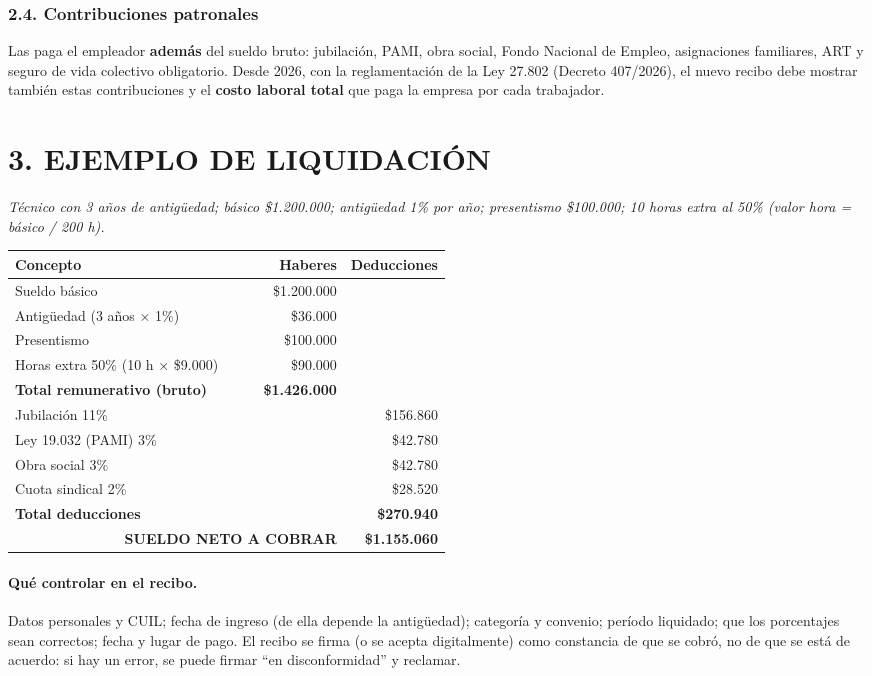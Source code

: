 \subsubsection*{2.4. Contribuciones patronales}
Las paga el empleador \textbf{además} del sueldo bruto: jubilación, PAMI, obra social, Fondo
Nacional de Empleo, asignaciones familiares, ART y seguro de vida colectivo obligatorio. Desde
2026, con la reglamentación de la Ley 27.802 (Decreto 407/2026), el nuevo recibo debe mostrar
también estas contribuciones y el \textbf{costo laboral total} que paga la empresa por cada
trabajador.

\section*{3. EJEMPLO DE LIQUIDACIÓN}

\textit{Técnico con 3 años de antigüedad; básico \$1.200.000; antigüedad 1\% por año;
presentismo \$100.000; 10 horas extra al 50\% (valor hora = básico / 200 h).}

\begin{center}
\small
\begin{tabular}{|p{0.52\linewidth}|r|r|}
\hline
\textbf{Concepto} & \textbf{Haberes} & \textbf{Deducciones} \\ \hline
Sueldo básico & \$1.200.000 & \\ \hline
Antigüedad (3 años $\times$ 1\%) & \$36.000 & \\ \hline
Presentismo & \$100.000 & \\ \hline
Horas extra 50\% (10 h $\times$ \$9.000) & \$90.000 & \\ \hline
\textbf{Total remunerativo (bruto)} & \textbf{\$1.426.000} & \\ \hline
Jubilación 11\% & & \$156.860 \\ \hline
Ley 19.032 (PAMI) 3\% & & \$42.780 \\ \hline
Obra social 3\% & & \$42.780 \\ \hline
Cuota sindical 2\% & & \$28.520 \\ \hline
\textbf{Total deducciones} & & \textbf{\$270.940} \\ \hline
\multicolumn{2}{|r|}{\textbf{SUELDO NETO A COBRAR}} & \textbf{\$1.155.060} \\ \hline
\end{tabular}
\end{center}

\paragraph*{Qué controlar en el recibo.}
Datos personales y CUIL; fecha de ingreso (de ella depende la antigüedad); categoría y
convenio; período liquidado; que los porcentajes sean correctos; fecha y lugar de pago. El
recibo se firma (o se acepta digitalmente) como constancia de que se cobró, no de que se está
de acuerdo: si hay un error, se puede firmar ``en disconformidad'' y reclamar.

